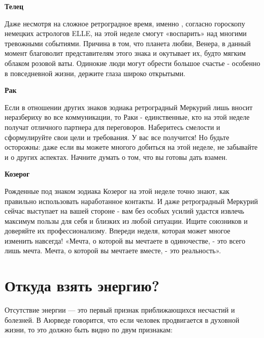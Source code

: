 \textbf{Телец}

Даже несмотря на сложное ретроградное время, именно , согласно гороскопу немецких астрологов ELLE, на этой неделе смогут «воспарить» над многими тревожными событиями. Причина в том, что планета любви, Венера, в данный момент благоволит представителям этого знака и окутывает их, будто мягким облаком розовой ваты. Одинокие люди могут обрести большое счастье - особенно в повседневной жизни, держите глаза широко открытыми.

\textbf{Рак}

Если в отношении других знаков зодиака ретроградный Меркурий лишь вносит неразбериху во все коммуникации, то Раки - единственные, кто на этой неделе получат отличного партнера для переговоров. Наберитесь смелости и сформулируйте свои цели и требования. У вас все получится! Но будьте осторожны: даже если вы можете многого добиться на этой неделе, не забывайте и о других аспектах. Начните думать о том, что вы готовы дать взамен.

\textbf{Козерог}

Рожденные под знаком зодиака Козерог на этой неделе точно знают, как правильно использовать наработанное контакты. И даже ретроградный Меркурий сейчас выступает на вашей стороне - вам без особых усилий удастся извлечь максимум пользы для себя и близких из любой ситуации. Ищите союзников и доверяйте их профессионализму. Впереди неделя, которая может многое изменить навсегда! «Мечта, о которой вы мечтаете в одиночестве, - это всего лишь мечта. Мечта, о которой вы мечтаете вместе, - это реальность».



\section{Откуда взять энергию?}
Отсутствие энергии --- это первый признак приближающихся несчастий и болезней. В Аюрведе говорится, что если человек продвигается в духовной жизни, то это должно быть видно по двум признакам:


